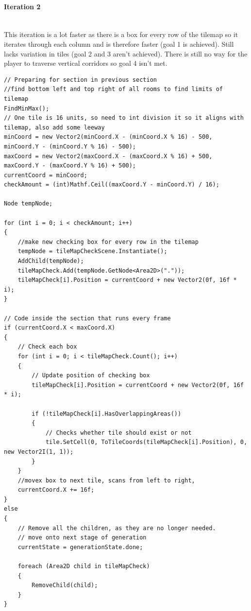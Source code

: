 \documentclass{article}
\newcommand{\myparagraph}[1]{\paragraph{#1}\mbox{}\\} %
\begin{document}
\myparagraph{Iteration 2}
This iteration is a lot faster as there is a box for every row of the tilemap so it iterates through each column and is therefore faster (goal 1 is achieved). Still lacks variation in tiles (goal 2 and 3 aren't achieved). There is still no way for the player to traverse vertical corridors so goal 4 isn't met.
\begin{lstlisting}
// Preparing for section in previous section
//find bottom left and top right of all rooms to find limits of tilemap
FindMinMax();
// One tile is 16 units, so need to int division it so it aligns with tilemap, also add some leeway
minCoord = new Vector2(minCoord.X - (minCoord.X % 16) - 500, minCoord.Y - (minCoord.Y % 16) - 500);
maxCoord = new Vector2(maxCoord.X - (maxCoord.X % 16) + 500, maxCoord.Y - (maxCoord.Y % 16) + 500);
currentCoord = minCoord;
checkAmount = (int)Mathf.Ceil((maxCoord.Y - minCoord.Y) / 16);

Node tempNode;

for (int i = 0; i < checkAmount; i++)
{
	//make new checking box for every row in the tilemap
    tempNode = tileMapCheckScene.Instantiate();
    AddChild(tempNode);
    tileMapCheck.Add(tempNode.GetNode<Area2D>("."));
    tileMapCheck[i].Position = currentCoord + new Vector2(0f, 16f * i);
}

// Code inside the section that runs every frame
if (currentCoord.X < maxCoord.X)
{
    // Check each box
    for (int i = 0; i < tileMapCheck.Count(); i++)
    {
        // Update position of checking box
        tileMapCheck[i].Position = currentCoord + new Vector2(0f, 16f * i);

        if (!tileMapCheck[i].HasOverlappingAreas())
        {
            // Checks whether tile should exist or not
            tile.SetCell(0, ToTileCoords(tileMapCheck[i].Position), 0, new Vector2I(1, 1));
        }
    }
	//movex box to next tile, scans from left to right,
    currentCoord.X += 16f;
}
else
{
    // Remove all the children, as they are no longer needed.
    // move onto next stage of generation
    currentState = generationState.done;

    foreach (Area2D child in tileMapCheck)
    {
        RemoveChild(child);
    }
}
\end{lstlisting}
\end{document}
